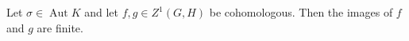 Let $\sigma \in \operatorname{Aut} K$ and let $f, g \in Z^1(G, H)$ be cohomologous. Then the images of $f$ and $g$ are finite.

